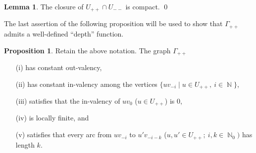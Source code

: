\documentclass{article}
\DeclareMathOperator\bbN{\mathbb{N}}
\theoremstyle{definition}
\newtheorem{lemma}[theorem]{Lemma}
\newtheorem{proposition}[theorem]{Proposition}
\begin{document}
\begin{lemma}\label{lem:compact_closure}
The closure of $U_{++}\cap U_{--}$ is compact. \qed
\end{lemma}

The last assertion of the following proposition will be used to show that $\Gamma_{++}$ admits a well-defined ``depth'' function.
\begin{proposition}\label{prop:properties_of_gamma_++}
Retain the above notation. The graph $\Gamma_{++}$
\begin{itemize}
 \item[(i)] has constant out-valency,
 \item[(ii)] has constant in-valency among the vertices $\{uv_{-i}\mid u\in U_{++},\ i\in\bbN\}$,
 \item[(iii)] satisfies that the in-valency of $uv_{0}$ ($u\in U_{++}$) is $0$,
 \item[(iv)] is locally finite, and
 \item[(v)] satisfies that every arc from $uv_{-i}$ to $u'v_{-i - k}$ ($u,u'\in U_{++};\ i,k\in\bbN_{0})$ has length $k$.
\end{itemize}
\end{proposition}
\end{document}
